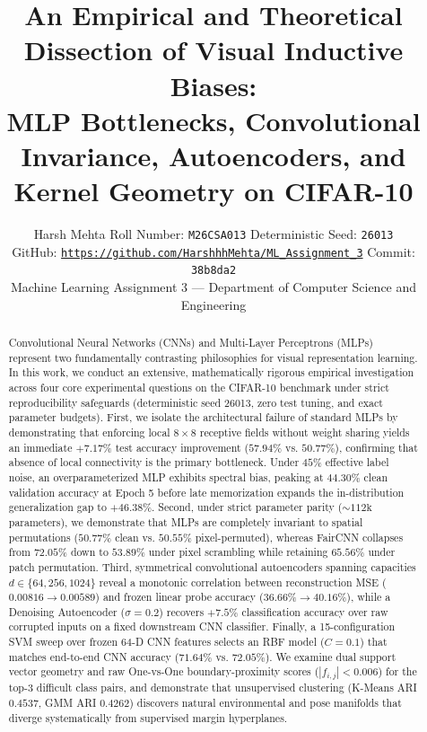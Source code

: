 \documentclass[10pt,twocolumn,letterpaper]{article}
\title{An Empirical and Theoretical Dissection of Visual Inductive Biases:\\MLP Bottlenecks, Convolutional Invariance, Autoencoders, and Kernel Geometry on CIFAR-10}
\author{
Harsh Mehta \quad Roll Number: \texttt{M26CSA013} \quad Deterministic Seed: \texttt{26013}\\
GitHub: \href{https://github.com/HarshhhMehta/ML_Assignment_3}{\texttt{https://github.com/HarshhhMehta/ML_Assignment_3}} \quad Commit: \texttt{38b8da2}\\
Machine Learning Assignment 3 — Department of Computer Science and Engineering
}
\begin{document}
\maketitle

\begin{abstract}
Convolutional Neural Networks (CNNs) and Multi-Layer Perceptrons (MLPs) represent two fundamentally contrasting philosophies for visual representation learning. In this work, we conduct an extensive, mathematically rigorous empirical investigation across four core experimental questions on the CIFAR-10 benchmark under strict reproducibility safeguards (deterministic seed 26013, zero test tuning, and exact parameter budgets). First, we isolate the architectural failure of standard MLPs by demonstrating that enforcing local $8 \times 8$ receptive fields without weight sharing yields an immediate $+7.17\%$ test accuracy improvement ($57.94\%$ vs. $50.77\%$), confirming that absence of local connectivity is the primary bottleneck. Under $45\%$ effective label noise, an overparameterized MLP exhibits spectral bias, peaking at $44.30\%$ clean validation accuracy at Epoch 5 before late memorization expands the in-distribution generalization gap to $+46.38\%$. Second, under strict parameter parity ($\sim 112\text{k}$ parameters), we demonstrate that MLPs are completely invariant to spatial permutations ($50.77\%$ clean vs. $50.55\%$ pixel-permuted), whereas FairCNN collapses from $72.05\%$ down to $53.89\%$ under pixel scrambling while retaining $65.56\%$ under patch permutation. Third, symmetrical convolutional autoencoders spanning capacities $d \in \{64, 256, 1024\}$ reveal a monotonic correlation between reconstruction MSE ($0.00816 \to 0.00589$) and frozen linear probe accuracy ($36.66\% \to 40.16\%$), while a Denoising Autoencoder ($\sigma=0.2$) recovers $+7.5\%$ classification accuracy over raw corrupted inputs on a fixed downstream CNN classifier. Finally, a 15-configuration SVM sweep over frozen 64-D CNN features selects an RBF model ($C=0.1$) that matches end-to-end CNN accuracy ($71.64\%$ vs. $72.05\%$). We examine dual support vector geometry and raw One-vs-One boundary-proximity scores ($|f_{i,j}| < 0.006$) for the top-3 difficult class pairs, and demonstrate that unsupervised clustering (K-Means ARI $0.4537$, GMM ARI $0.4262$) discovers natural environmental and pose manifolds that diverge systematically from supervised margin hyperplanes.
\end{abstract}









{\small


}
\end{document}
